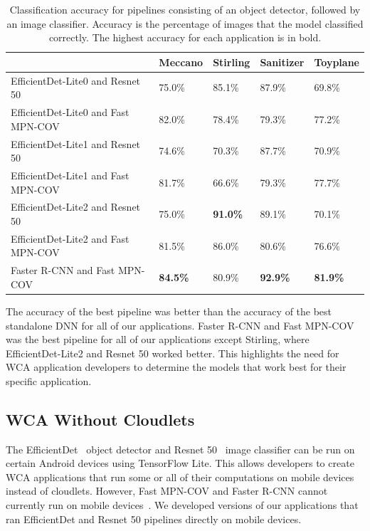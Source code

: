 \begin{table}
\begin{tabular}{|l||l|l|l|l|}
  \hline
  & Meccano & Stirling & Sanitizer & Toyplane\\
  \hline
  \hline
  EfficientDet-Lite0 and Resnet 50 & 75.0\% & 85.1\% & 87.9\% & 69.8\%\\
  EfficientDet-Lite0 and Fast MPN-COV & 82.0\% & 78.4\% & 79.3\% & 77.2\%\\
  EfficientDet-Lite1 and Resnet 50 & 74.6\% & 70.3\% & 87.7\% & 70.9\%\\
  EfficientDet-Lite1 and Fast MPN-COV & 81.7\% & 66.6\% & 79.3\% & 77.7\%\\
  EfficientDet-Lite2 and Resnet 50 & 75.0\% & \textbf{91.0\%} & 89.1\% & 70.1\%\\
  EfficientDet-Lite2 and Fast MPN-COV & 81.5\% & 86.0\% & 80.6\% & 76.6\%\\
  Faster R-CNN and Fast MPN-COV & \textbf{84.5\%} & 80.9\% & \textbf{92.9\%} & \textbf{81.9\%}\\
  \hline
\end{tabular}
  \caption{
    Classification accuracy for pipelines consisting of an object detector,
    followed by an image classifier.
    Accuracy is the percentage of images that the model classified correctly.
    The highest accuracy for each application is in bold.
  }\label{tab:pipeline_accuracy}
\end{table}

The accuracy of the best pipeline was better than the accuracy of the best
standalone DNN for all of our applications.
Faster R-CNN and Fast MPN-COV was the best pipeline for all of our applications
except Stirling, where EfficientDet-Lite2 and Resnet 50 worked better.
This highlights the need for WCA application developers to determine the models
that work best for their specific application.

\subsection{WCA Without Cloudlets}

The EfficientDet~\cite{Tan2020} object detector and Resnet 50~\cite{He2016}
image classifier can be run on certain Android devices using TensorFlow Lite.
This allows developers to create WCA applications that run some or all of their
computations on mobile devices instead of cloudlets.
However, Fast MPN-COV and Faster R-CNN cannot currently run on mobile
devices~\cite{tflite, torchscript}.
We developed versions of our applications that ran EfficientDet and Resnet 50
pipelines directly on mobile devices.

